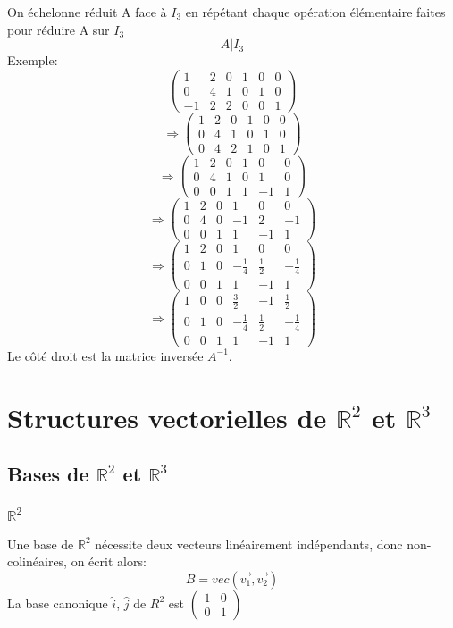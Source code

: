 \documentclass[10pt,a4paper]{book}
\newcommand{\R}{\mathbb{R}}
\begin{document}
On échelonne réduit A face à $I_3$ en répétant chaque opération élémentaire faites pour réduire A sur $I_3$
\[A | I_3 \]
Exemple:
\[\left(\begin{array}{ccc|ccc}
1 & 2 & 0 & 1 & 0 & 0 \\
0 & 4 & 1 & 0 & 1 & 0 \\
-1 & 2 & 2 & 0 & 0 & 1
\end{array}
\right)\]
\[\Rightarrow \left(\begin{array}{ccc|ccc}
1 & 2 & 0 & 1 & 0 & 0 \\
0 & 4 & 1 & 0 & 1 & 0 \\
0 & 4 & 2 & 1 & 0 & 1
\end{array}
\right)\]
\[\Rightarrow \left(\begin{array}{ccc|ccc}
1 & 2 & 0 & 1 & 0 & 0 \\
0 & 4 & 1 & 0 & 1 & 0 \\
0 & 0 & 1 & 1 & -1 & 1
\end{array}
\right)\]
\[\Rightarrow \left(\begin{array}{ccc|ccc}
1 & 2 & 0 & 1 & 0 & 0 \\
0 & 4 & 0 & -1 & 2 & -1 \\
0 & 0 & 1 & 1 & -1 & 1
\end{array}
\right)\]
\[\Rightarrow \left(\begin{array}{ccc|ccc}
1 & 2 & 0 & 1 & 0 & 0 \\
0 & 1 & 0 & -\frac{1}{4} & \frac{1}{2} & -\frac{1}{4} \\
0 & 0 & 1 & 1 & -1 & 1
\end{array}
\right)\]
\[\Rightarrow \left(\begin{array}{ccc|ccc}
1 & 0 & 0 & \frac{3}{2} & -1 & \frac{1}{2} \\
0 & 1 & 0 & -\frac{1}{4} & \frac{1}{2} & -\frac{1}{4} \\
0 & 0 & 1 & 1 & -1 & 1
\end{array}
\right)\]
Le côté droit est la matrice inversée $A^{-1}$.

\chapter{Structures vectorielles de \texorpdfstring{$\R^2$ et $\R^3$}{R2 et R3}}

\section{Bases de \texorpdfstring{$\R^2$ et $\R^3$}{R2 et R3}}

\subsection{\texorpdfstring{$\R^2$}{R2}}

Une base de $\R^2 $ nécessite deux vecteurs linéairement indépendants, donc non-colinéaires, on écrit alors:
\[B = vec\left(\vec{v_1}, \vec{v_2}\right)\]
La base canonique $\hat{i}$, $\hat{j}$ de $R^2$ est \(\begin{pmatrix}
1 & 0 \\ 0 & 1 \end{pmatrix}\)
\end{document}
